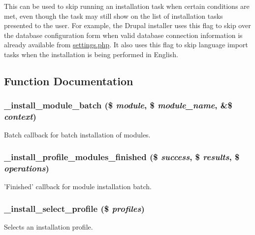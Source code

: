 This can be used to skip running an installation task when certain conditions are met, even though the task may still show on the list of installation tasks presented to the user. For example, the Drupal installer uses this flag to skip over the database configuration form when valid database connection information is already available from \hyperlink{settings_8php}{settings.php}. It also uses this flag to skip language import tasks when the installation is being performed in English. 

\subsection{Function Documentation}
\hypertarget{install_8core_8inc_aa0dfff943ef80d5bfad2f0be5c4cff19}{
\subsubsection[{\_\-install\_\-module\_\-batch}]{\setlength{\rightskip}{0pt plus 5cm}\_\-install\_\-module\_\-batch (\$ {\em module}, \/  \$ {\em module\_\-name}, \/  \&\$ {\em context})}}
\label{install_8core_8inc_aa0dfff943ef80d5bfad2f0be5c4cff19}
Batch callback for batch installation of modules. \hypertarget{install_8core_8inc_aa345da0dac456ba24a1551a9ce3ce4dc}{
\subsubsection[{\_\-install\_\-profile\_\-modules\_\-finished}]{\setlength{\rightskip}{0pt plus 5cm}\_\-install\_\-profile\_\-modules\_\-finished (\$ {\em success}, \/  \$ {\em results}, \/  \$ {\em operations})}}
\label{install_8core_8inc_aa345da0dac456ba24a1551a9ce3ce4dc}
'Finished' callback for module installation batch. \hypertarget{install_8core_8inc_a50f553802d50cc291614aa584c6960b1}{
\subsubsection[{\_\-install\_\-select\_\-profile}]{\setlength{\rightskip}{0pt plus 5cm}\_\-install\_\-select\_\-profile (\$ {\em profiles})}}
\label{install_8core_8inc_a50f553802d50cc291614aa584c6960b1}
Selects an installation profile.

